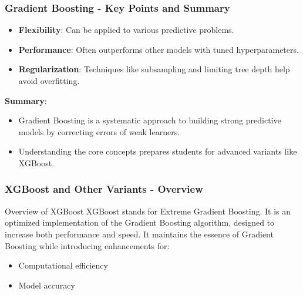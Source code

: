 \documentclass[aspectratio=169]{beamer}
\begin{document}
\begin{frame}[fragile]
    \frametitle{Gradient Boosting - Key Points and Summary}
    \begin{itemize}
        \item \textbf{Flexibility}: Can be applied to various predictive problems.
        \item \textbf{Performance}: Often outperforms other models with tuned hyperparameters.
        \item \textbf{Regularization}: Techniques like subsampling and limiting tree depth help avoid overfitting.
    \end{itemize}

    \textbf{Summary}:
    \begin{itemize}
        \item Gradient Boosting is a systematic approach to building strong predictive models by correcting errors of weak learners.
        \item Understanding the core concepts prepares students for advanced variants like XGBoost.
    \end{itemize}
\end{frame}

\begin{frame}
    \frametitle{XGBoost and Other Variants - Overview}
    \begin{block}{Overview of XGBoost}
        XGBoost stands for Extreme Gradient Boosting. It is an optimized implementation of the Gradient Boosting algorithm, designed to increase both performance and speed. It maintains the essence of Gradient Boosting while introducing enhancements for:
        \begin{itemize}
            \item Computational efficiency
            \item Model accuracy
        \end{itemize}
    \end{block}
\end{frame}
\end{document}
